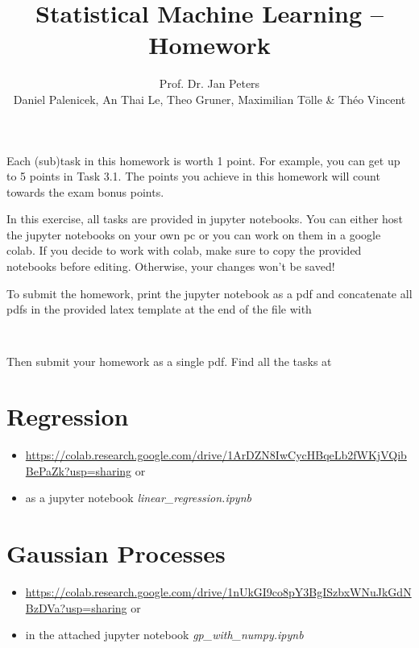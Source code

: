 \documentclass[
	ngerman,
	points=true,%
    solution=true,
    accentcolor=9c,
    colorbacktitle
	]{tudaexercise}
\begin{document}
\title[Homework 3/4]{Statistical Machine Learning -- Homework}
\author{Prof. Dr. Jan Peters \\ Daniel Palenicek, An Thai Le, Theo Gruner, Maximilian Tölle \& Théo Vincent}

\maketitle
Each (sub)task in this homework is worth 1 point. For example, you can get up to 5 points in Task 3.1. The points you achieve in this homework will count towards the exam bonus points.

In this exercise, all tasks are provided in jupyter notebooks. You can either host the jupyter notebooks on your own pc or you can work on them in a google colab. If you decide to work with colab, make sure to copy the provided notebooks before editing. Otherwise, your changes won't be saved!

To submit the homework, print the jupyter notebook as a pdf and concatenate all pdfs in the provided latex template at the end of the file with
\begin{verbatim}
    
\end{verbatim}

Then submit your homework as a single pdf. Find all the tasks at 

\section*{Regression}
\begin{itemize}
    \item \href{https://colab.research.google.com/drive/1ArDZN8IwCycHBqeLb2fWKjVQibBePaZk?usp=sharing}{https://colab.research.google.com/drive/1ArDZN8IwCycHBqeLb2fWKjVQibBePaZk?usp=sharing} or
    \item as a jupyter notebook \textit{linear\_regression.ipynb}
\end{itemize}

\section*{Gaussian Processes}
\begin{itemize}
    \item \href{https://colab.research.google.com/drive/1nUkGI9co8pY3BgISzbxWNuJkGdNBzDVa?usp=sharing}{https://colab.research.google.com/drive/1nUkGI9co8pY3BgISzbxWNuJkGdNBzDVa?usp=sharing} or
    \item in the attached jupyter notebook \textit{gp\_with\_numpy.ipynb}
\end{itemize}
\end{document}
